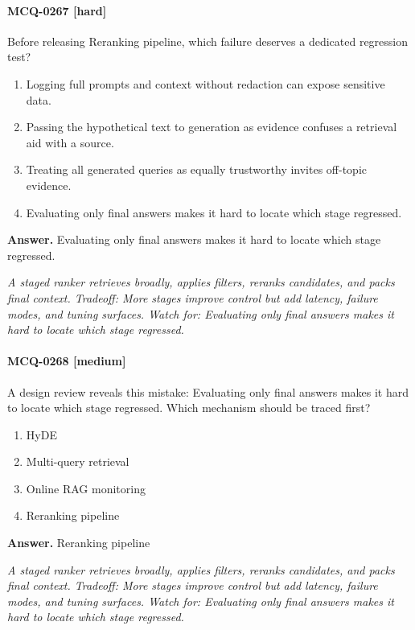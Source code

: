 \paragraph{MCQ-0267 [hard]} Before releasing Reranking pipeline, which failure deserves a dedicated regression test?
\begin{enumerate}[label=\Alph*.]
\item Logging full prompts and context without redaction can expose sensitive data.
\item Passing the hypothetical text to generation as evidence confuses a retrieval aid with a source.
\item Treating all generated queries as equally trustworthy invites off-topic evidence.
\item Evaluating only final answers makes it hard to locate which stage regressed.
\end{enumerate}
\noindent\textbf{Answer.} Evaluating only final answers makes it hard to locate which stage regressed.
\par\textit{A staged ranker retrieves broadly, applies filters, reranks candidates, and packs final context. Tradeoff: More stages improve control but add latency, failure modes, and tuning surfaces. Watch for: Evaluating only final answers makes it hard to locate which stage regressed.}
\paragraph{MCQ-0268 [medium]} A design review reveals this mistake: Evaluating only final answers makes it hard to locate which stage regressed. Which mechanism should be traced first?
\begin{enumerate}[label=\Alph*.]
\item HyDE
\item Multi-query retrieval
\item Online RAG monitoring
\item Reranking pipeline
\end{enumerate}
\noindent\textbf{Answer.} Reranking pipeline
\par\textit{A staged ranker retrieves broadly, applies filters, reranks candidates, and packs final context. Tradeoff: More stages improve control but add latency, failure modes, and tuning surfaces. Watch for: Evaluating only final answers makes it hard to locate which stage regressed.}
